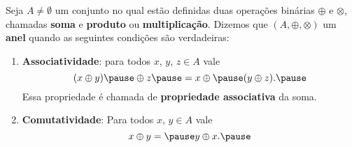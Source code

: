 \documentclass{beamer}
\begin{document}
    \begin{frame}
        \begin{definicao}
            Seja $A \ne \emptyset$ um conjunto \pause no qual est\~ao definidas duas opera{\c c}{\~o}es bin\'arias \pause $\oplus$ \pause e $\otimes$, \pause chamadas \textbf{soma} \pause e \textbf{produto} \pause ou \textbf{multiplicação}. \pause Dizemos que $(A, \oplus, \otimes)$  um \textbf{anel} \pause quando as seguintes condi{\c c}{\~o}es s{\~a}o verdadeiras:\pause
            \begin{enumerate}[label={\roman*})]
                \item \textbf{Associatividade}: \pause para todos $x$, \pause $y$, \pause $z \in A$ \pause vale\pause
                \[
                    (x \oplus y) \pause \oplus z \pause = x \oplus \pause (y \oplus z).\pause
                \]
                Essa propriedade {\'e} chamada de \pause \textbf{propriedade associativa} \pause da soma.\pause

                \vspace{.7cm}

                \item \textbf{Comutatividade}: \pause Para todos $x$, \pause $y \in A$ \pause vale\pause
                \[
                    x \oplus y = \pause y \oplus x.\pause
                \]

                \vspace{.7cm}

                \seti
            \end{enumerate}
        \end{definicao}
    \end{frame}
\end{document}
